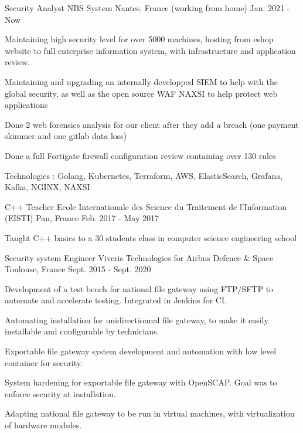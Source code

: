 \begin{cventries}
  \cventry
  {Security Analyst}
  {NBS System}
  {Nantes, France (working from home)}
  {Jan. 2021 - Now}
  {
  \begin{cvitems}
    \item {Maintaining high security level for over 5000 machines, hosting from eshop website to full enterprise information system, with infrastructure and application review.}
    \item {Maintaining and upgrading an internally developped SIEM to help with the global security, as well as the open source WAF NAXSI to help protect web applications}
    \item {Done 2 web forensics analysis for our client after they add a breach (one payment skimmer and one gitlab data loss)}
    \item {Done a full Fortigate firewall configuration review containing over 130 rules}
    \item {Technologies : Golang, Kubernetes, Terraform, AWS, ElasticSearch, Grafana, Kafka, NGINX, NAXSI}
  \end{cvitems}
  }
  \cventry
  {C++ Teacher}
  {Ecole Internationale des Science du Traitement de l'Information (EISTI)}
  {Pau, France}
  {Feb. 2017 - May 2017}
  {
  \begin{cvitems}
    \item {Taught C++ basics to a 30 students class in computer science engineering school}
  \end{cvitems}
  }
  \cventry
  {Security system Engineer}
  {Viveris Technologies for Airbus Defence \& Space}
  {Toulouse, France}
  {Sept. 2015 - Sept. 2020}
  {
  \begin{cvitems}
    \item {Development of a test bench for national file gateway using FTP/SFTP to automate and accelerate testing. Integrated in Jenkins for CI.}
    \item {Automating installation for unidirectionnal file gateway, to make it easily installable and configurable by technicians.}
    \item {Exportable file gateway system development and automation with low level container for security.}
    \item {System hardening for exportable file gateway with OpenSCAP. Goal was to enforce security at installation.}
    \item {Adapting national file gateway to be run in virtual machines, with virtualization of hardware modules.}

\end{cvitems}}
\end{cventries}
